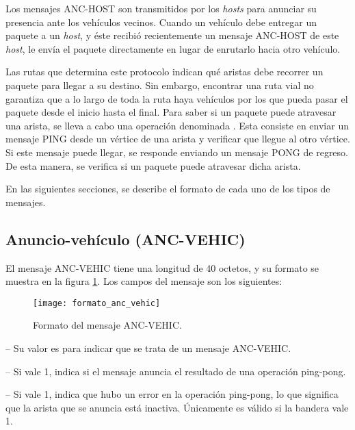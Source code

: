 Los mensajes ANC-HOST son transmitidos por los \textit{hosts} para anunciar su
presencia ante los vehículos vecinos. Cuando un vehículo debe entregar un
paquete a un \textit{host}, y éste recibió recientemente un mensaje ANC-HOST de
este \textit{host}, le envía el paquete directamente en lugar de enrutarlo
hacia otro vehículo.

Las rutas que determina este protocolo indican qué aristas debe recorrer un
paquete para llegar a su destino. Sin embargo, encontrar una ruta vial no
garantiza que a lo largo de toda la ruta haya vehículos por los que pueda pasar
el paquete desde el inicio hasta el final. Para saber si un paquete puede
atravesar una arista, se lleva a cabo una operación denominada
. Esta consiste en enviar un mensaje PING desde un vértice
de una arista y verificar que llegue al otro vértice. Si este mensaje puede
llegar, se responde enviando un mensaje PONG de regreso. De esta manera, se
verifica si un paquete puede atravesar dicha arista.

En las siguientes secciones, se describe el formato de cada uno de los tipos de
mensajes.

\subsection{Anuncio-vehículo (ANC-VEHIC)}

\label{subsec:mensaje_anc_vehic}

El mensaje ANC-VEHIC tiene una longitud de 40 octetos, y su formato se muestra
en la figura \ref{fig:formato_anc_vehic}. Los campos del mensaje son los
siguientes:

\begin{figure}[th!]
\centering
\texttt{[image: formato\_anc\_vehic]}
\decoRule
\caption[Formato del mensaje ANC-VEHIC]{Formato del mensaje ANC-VEHIC.}
\label{fig:formato_anc_vehic}
\end{figure}

 -- Su valor es  para indicar que se trata de un
mensaje ANC-VEHIC.

 -- Si vale 1, indica si el mensaje anuncia el resultado de
una operación ping-pong.

 -- Si vale 1, indica que hubo un error en la operación
ping-pong, lo que significa que la arista que se anuncia está inactiva.
Únicamente es válido si la bandera  vale 1.

